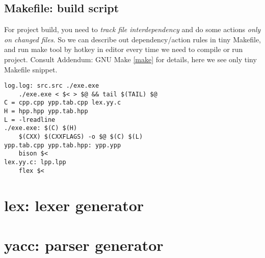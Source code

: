 \subsection{Makefile: build script}

For project build, you need to \emph{track file interdependency} and do some
actions \emph{only on changed files}. So we can describe out dependency/action
rules in tiny Makefile, and run make tool by hotkey in editor every time we need
to compile or run project. Consult Addendum: GNU Make \ref{make} for details,
here we see only tiny Makefile snippet.

\clearpage
\begin{lstlisting}
log.log: src.src ./exe.exe
    ./exe.exe < $< > $@ && tail $(TAIL) $@
C = cpp.cpp ypp.tab.cpp lex.yy.c
H = hpp.hpp ypp.tab.hpp
L = -lreadline
./exe.exe: $(C) $(H)
    $(CXX) $(CXXFLAGS) -o $@ $(C) $(L)
ypp.tab.cpp ypp.tab.hpp: ypp.ypp
    bison $<
lex.yy.c: lpp.lpp
    flex $<
\end{lstlisting}

\section{lex: lexer generator}

\section{yacc: parser generator}
